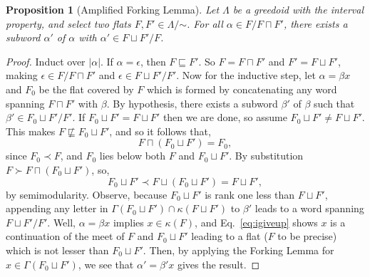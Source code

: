 \documentclass[11pt]{article}
\newtheorem{proposition}[theorem]{Proposition}
\newcommand{\glang}{\Lambda}
\begin{document}
\begin{proposition}[Amplified Forking Lemma]\label{prop:amplified-forking}
    Let $\glang$ be a greedoid with the interval property, and select two flats $F, F'\in\glang/\mathord{\sim}$.
    For all $\alpha \in F/F\sqcap F'$, there exists a subword $\alpha'$ of $\alpha$ with $\alpha' \in F\sqcup F'/F$.
\end{proposition}
\begin{proof}
    Induct over $|\alpha|$.
    If $\alpha = \epsilon$, then $F\sqsubseteq F'$.
    So $F=F\sqcap F'$ and $F' = F\sqcup F'$, making $\epsilon \in F/F\sqcap F'$ and $\epsilon \in F\sqcup F'/F'$.
    Now for the inductive step, let $\alpha = \beta x$ and $F_0$ be the flat covered by $F$ which is formed by concatenating any word spanning $F\sqcap F'$ with $\beta$.
    By hypothesis, there exists a subword $\beta'$ of $\beta$ such that $\beta'\in F_0\sqcup F'/F'$.
    If $F_0\sqcup F' = F\sqcup F'$ then we are done,
    so assume $F_0\sqcup F' \neq F\sqcup F'$.
    This makes $F\not\sqsubseteq F_0\sqcup F'$, and so it follows that,
    \begin{equation}\label{eq:igiveup}
        F \sqcap (F_0\sqcup F') = F_0, 
    \end{equation}
    since $F_0 \prec F$, and $F_0$ lies below both $F$ and $F_0\sqcup F'$.
    By substitution $F \succ F \sqcap (F_0\sqcup F')$, so,
    \[
        F_0\sqcup F' \prec F \sqcup (F_0\sqcup F') = F\sqcup F',
    \]
    by semimodularity.
    Observe, because $F_0\sqcup F'$ is rank one less than $F\sqcup F'$, appending any letter in $\Gamma(F_0\sqcup F')\cap\kappa(F\sqcup F')$ to $\beta'$ leads to a word spanning $F\sqcup F'/F'$.
    Well, $\alpha = \beta x$ implies $x \in \kappa(F)$, and Eq.~\ref{eq:igiveup} shows $x$ is a continuation of the meet of $F$ and  $F_0\sqcup F'$ leading to a flat ($F$ to be precise) which is not lesser than $F_0\sqcup F'$.
    Then, by applying the Forking Lemma for $x \in \Gamma(F_0\sqcup F')$, we see that $\alpha'=\beta'x$ gives the result.
\end{proof}
\end{document}
